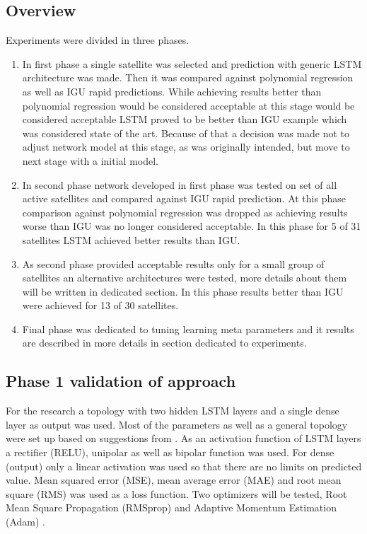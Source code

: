 \documentclass{kybernetika}
\begin{document}
\subsection{Overview}
Experiments were divided in three phases.
\begin{enumerate}
\item In first phase a single satellite was selected and prediction with generic LSTM architecture
	was made. Then it was compared against polynomial regression as well as IGU rapid predictions.
	While achieving results better than polynomial regression would be considered acceptable at 
	this stage would be considered acceptable LSTM proved to be better than IGU example which
	was considered state of the art. Because of that a decision was made not to adjust network
	model at this stage, as was originally intended, but move to next stage with a initial model.

\item In second phase network developed in first phase was tested on set of all active 
	satellites and compared against IGU rapid prediction. At this phase comparison against 
	polynomial regression was dropped as achieving results worse than IGU was no longer 
	considered acceptable. In this phase for 5 of 31 satellites LSTM achieved better 
	results than IGU.

\item As second phase provided acceptable results only for a small group of satellites 
	an alternative architectures were tested, more details about them will be written in 
	dedicated section. In this phase results better than IGU were achieved 
	for 13 of 30 satellites.
\item Final phase was dedicated to tuning learning meta parameters and it results are described
	in more details in section dedicated to experiments.

\end{enumerate}

\subsection{Phase 1 validation of approach}
For the research a topology with two hidden LSTM layers and a single dense layer as output was 
used. 
Most of the parameters as well as a general topology were set up based on suggestions from 
\cite{Chollet2018}. As an activation function of LSTM layers a rectifier (RELU),
unipolar as well as bipolar function was used.
For dense (output) only a linear activation was used so that there are no limits on predicted 
value.
Mean squared error (MSE), mean average error (MAE) and root mean square (RMS)
was used as a loss function.
Two optimizers will be tested, Root Mean Square Propagation (RMSprop)\cite{Hinton2012} and 
Adaptive Momentum Estimation (Adam) \cite{Kingma2015}.
\end{document}
